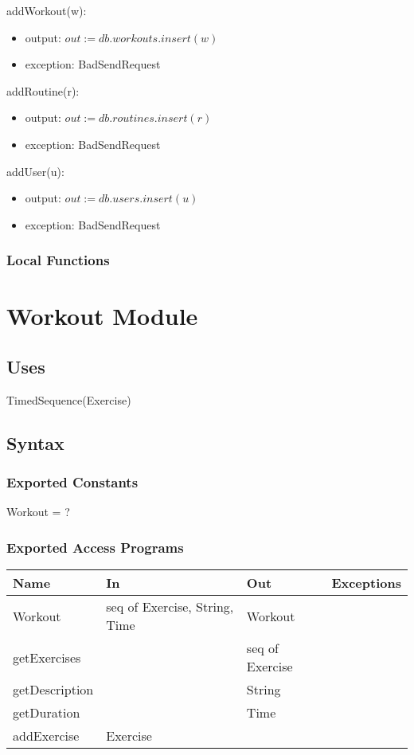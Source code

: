 \documentclass[12pt, titlepage]{article}
\begin{document}
addWorkout(w):
\begin{itemize}
	\item output: $out := db.workouts.insert(w)$
	\item exception: BadSendRequest
\end{itemize}

addRoutine(r):
\begin{itemize}
	\item output: $out := db.routines.insert(r)$
	\item exception: BadSendRequest
\end{itemize}

addUser(u):
\begin{itemize}
	\item output: $out := db.users.insert(u)$
	\item exception: BadSendRequest
\end{itemize}



\subsubsection{Local Functions}


\newpage

\section{Workout Module}

\subsection{Uses}
TimedSequence(Exercise)
\subsection{Syntax}

\subsubsection{Exported Constants}
Workout = ?
\subsubsection{Exported Access Programs}

\begin{center}
	\begin{tabular}{p{2cm} p{4cm} p{4cm} p{2cm}}
		\hline
		\textbf{Name} & \textbf{In} & \textbf{Out} & \textbf{Exceptions} \\
		\hline
		Workout & seq of Exercise, String, Time & Workout &  \\
		getExercises &  & seq of Exercise &  \\
		getDescription &  & String &  \\
		getDuration &  & Time &  \\
		addExercise & Exercise & &  \\
		\hline
	\end{tabular}
\end{center}
\end{document}
